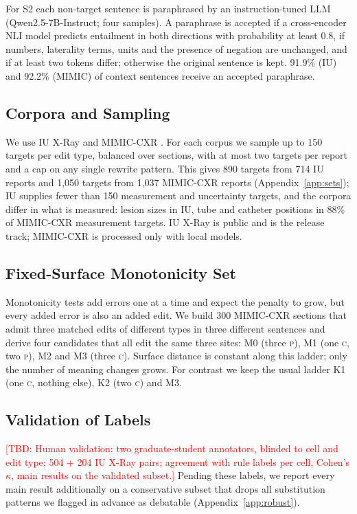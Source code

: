 \documentclass[11pt]{article}
\newcommand{\Pc}{\textsc{p}\xspace}
\newcommand{\Cc}{\textsc{c}\xspace}
\newcommand{\tbd}[1]{\textcolor{red}{[TBD: #1]}}
\begin{document}
For S2 each non-target sentence is paraphrased by an instruction-tuned LLM (Qwen2.5-7B-Instruct; four samples). A paraphrase is accepted if a cross-encoder NLI model predicts entailment in both directions with probability at least 0.8, if numbers, laterality terms, units and the presence of negation are unchanged, and if at least two tokens differ; otherwise the original sentence is kept. 91.9\% (IU) and 92.2\% (MIMIC) of context sentences receive an accepted paraphrase.

\subsection{Corpora and Sampling}

We use IU X-Ray \citep{demner-fushman-etal-2016-iu} and MIMIC-CXR \citep{johnson-etal-2019-mimiccxr}. For each corpus we sample up to 150 targets per edit type, balanced over sections, with at most two targets per report and a cap on any single rewrite pattern. This gives 890 targets from 714 IU reports and 1,050 targets from 1,037 MIMIC-CXR reports (Appendix~\ref{app:sets}); IU supplies fewer than 150 measurement and uncertainty targets, and the corpora differ in what is measured: lesion sizes in IU, tube and catheter positions in 88\% of MIMIC-CXR measurement targets. IU X-Ray is public and is the release track; MIMIC-CXR is processed only with local models.

\subsection{Fixed-Surface Monotonicity Set}
\label{sec:monodesign}

Monotonicity tests add errors one at a time and expect the penalty to grow, but every added error is also an added edit. We build 300 MIMIC-CXR sections that admit three matched edits of different types in three different sentences and derive four candidates that all edit the same three sites: M0 (three \Pc), M1 (one \Cc, two \Pc), M2 and M3 (three \Cc). Surface distance is constant along this ladder; only the number of meaning changes grows. For contrast we keep the usual ladder K1 (one \Cc, nothing else), K2 (two \Cc) and M3.

\subsection{Validation of Labels}
\label{sec:human}

\tbd{Human validation: two graduate-student annotators, blinded to cell and edit type; 504 + 204 IU X-Ray pairs; agreement with rule labels per cell, Cohen's $\kappa$, main results on the validated subset.}
Pending these labels, we report every main result additionally on a conservative subset that drops all substitution patterns we flagged in advance as debatable (Appendix~\ref{app:robust}).
\end{document}

